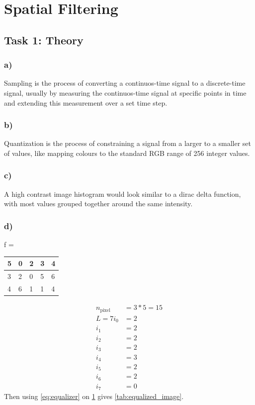 \section{Spatial Filtering}

\subsection{Task 1: Theory}
\subsubsection*{a)}
Sampling is the process of converting a continuos-time signal to a discrete-time signal, usually by measuring the continuos-time signal at specific points in time and extending this measurement over a set time step. 

\subsubsection*{b)}
Quantization is the process of constraining a signal from a larger to a smaller set of values, like mapping colours to the standard RGB range of 256 integer values. 

\subsubsection*{c)}
A high contrast image histogram would look similar to a dirac delta function, with most values grouped together around the same intensity.

\subsubsection*{d)}
\begin{table}[]
    \label{tab:initial_image}
    f = \begin{tabular}{|l|l|l|l|l|}
        \hline
        5 & 0 & 2 & 3 & 4 \\ \hline
        3 & 2 & 0 & 5 & 6 \\ \hline
        4 & 6 & 1 & 1 & 4 \\ \hline
    \end{tabular}
\end{table}
\begin{align*}
    n_{\text{pixel}} &= 3 * 5 = 15 \\
    L = 7
    i_0 &= 2 \\ 
    i_1 &= 2 \\
    i_2 &= 2 \\
    i_3 &= 2 \\
    i_4 &= 3 \\
    i_5 &= 2 \\
    i_6 &= 2 \\
    i_7 &= 0
\end{align*}
Then using \cref{eq:equalizer} on \cref{tab:initial_image} gives \cref{tab:equalized_image}. 

